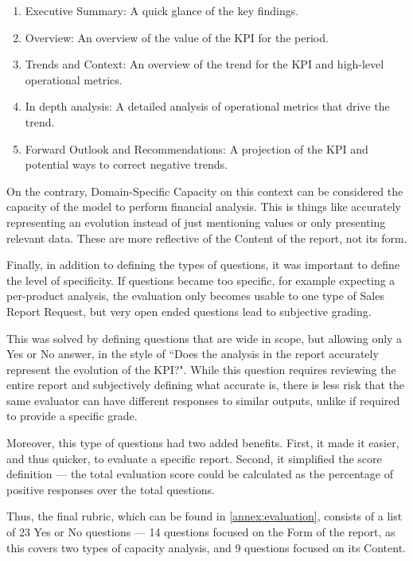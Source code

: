 \documentclass[a4paper]{report}
\begin{document}
\begin{enumerate}
    \item Executive Summary: A quick glance of the key findings.
    \item Overview: An overview of the value of the KPI for the period.
    \item Trends and Context: An overview of the trend for the KPI and high-level operational metrics.
    \item In depth analysis: A detailed analysis of operational metrics that drive the trend.
    \item Forward Outlook and Recommendations: A projection of the KPI and potential ways to correct negative trends.
\end{enumerate}

On the contrary, Domain-Specific Capacity on this context can be considered the capacity of the model to perform financial analysis. This is things like accurately representing an evolution instead of just mentioning values or only presenting relevant data. These are more reflective of the Content of the report, not its form.

Finally, in addition to defining the types of questions, it was important to define the level of specificity. If questions became too specific, for example expecting a per-product analysis, the evaluation only becomes usable to one type of Sales Report Request, but very open ended questions lead to subjective grading.

This was solved by defining questions that are wide in scope, but allowing only a Yes or No answer, in the style of ``Does the analysis in the report accurately represent the evolution of the KPI?". While this question requires reviewing the entire report and subjectively defining what accurate is, there is less risk that the same evaluator can have different responses to similar outputs, unlike if required to provide a specific grade.

Moreover, this type of questions had two added benefits. First, it made it easier, and thus quicker, to evaluate a specific report. Second, it simplified the score definition --- the total evaluation score could be calculated as the percentage of positive responses over the total questions.

Thus, the final rubric, which can be found in \autoref{annex:evaluation}, consists of a list of 23 Yes or No questions --- 14 questions focused on the Form of the report, as this covers two types of capacity analysis, and 9 questions focused on its Content.
\end{document}
